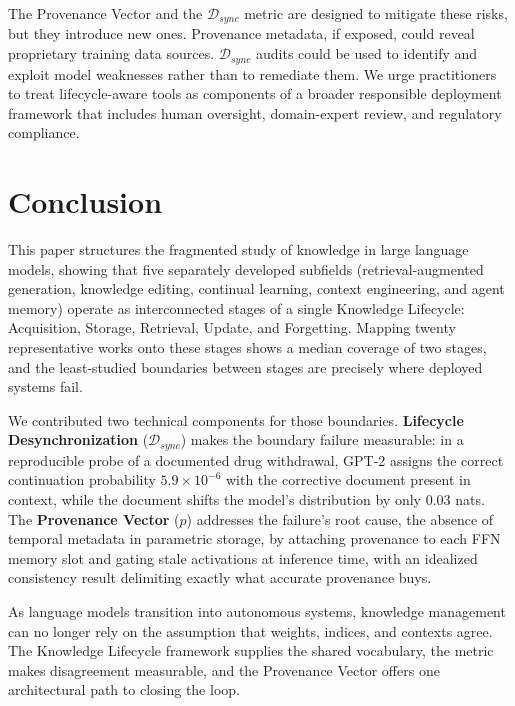 \documentclass{article}
\begin{document}
The Provenance Vector and the $\mathcal{D}_{sync}$ metric are designed to mitigate these risks, but they introduce new ones. Provenance metadata, if exposed, could reveal proprietary training data sources. $\mathcal{D}_{sync}$ audits could be used to identify and exploit model weaknesses rather than to remediate them. We urge practitioners to treat lifecycle-aware tools as components of a broader responsible deployment framework that includes human oversight, domain-expert review, and regulatory compliance.

\section{Conclusion}
\label{sec:conclusion}

This paper structures the fragmented study of knowledge in large language models, showing that five separately developed subfields (retrieval-augmented generation, knowledge editing, continual learning, context engineering, and agent memory) operate as interconnected stages of a single Knowledge Lifecycle: Acquisition, Storage, Retrieval, Update, and Forgetting. Mapping twenty representative works onto these stages shows a median coverage of two stages, and the least-studied boundaries between stages are precisely where deployed systems fail.

We contributed two technical components for those boundaries. \textbf{Lifecycle Desynchronization} ($\mathcal{D}_{sync}$) makes the boundary failure measurable: in a reproducible probe of a documented drug withdrawal, GPT-2 assigns the correct continuation probability $5.9 \times 10^{-6}$ with the corrective document present in context, while the document shifts the model's distribution by only $0.03$ nats. The \textbf{Provenance Vector} ($p$) addresses the failure's root cause, the absence of temporal metadata in parametric storage, by attaching provenance to each FFN memory slot and gating stale activations at inference time, with an idealized consistency result delimiting exactly what accurate provenance buys.

As language models transition into autonomous systems, knowledge management can no longer rely on the assumption that weights, indices, and contexts agree. The Knowledge Lifecycle framework supplies the shared vocabulary, the metric makes disagreement measurable, and the Provenance Vector offers one architectural path to closing the loop.
\end{document}
